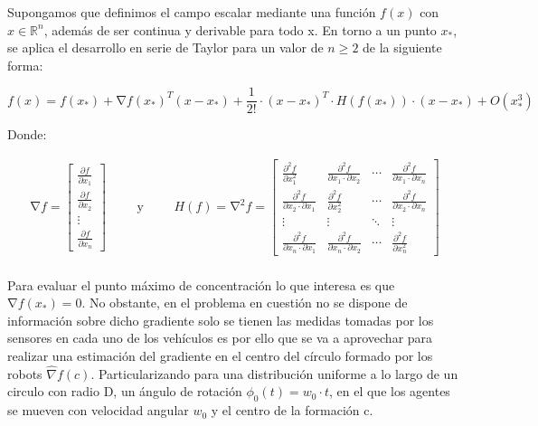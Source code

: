 Supongamos que definimos el campo escalar mediante una función $f\left(x\right)$ con $x\in\mathbb{R}^{n}$, además de ser continua y derivable para todo x. En torno a un punto $x_*$, se aplica el desarrollo en serie de Taylor para un valor de $n\geq{2}$ de la siguiente forma:

\begin{equation}\label{TaylorNormal}
	f\left(x\right)=f\left(x_{*}\right)+\mathrm{\nabla}{f}{\left(x_{*}\right)}^{T}\left(x-x_{*}\right)+\frac{1}{2!}\cdot{\left(x-x_{*}\right)}^{T}\cdot{H}\left({f}\left(x_{*}\right)\right) 		\cdot\left(x-x_{*}\right)+O\left(x_{*}^3\right)
\end{equation}

Donde:

\begin{equation*}
	\begin{aligned}
		\mathrm{\nabla}{f}=
	\begin{bmatrix}
		\frac{\partial{f}}{\partial{x}_1} \\
		\frac{\partial{f}}{\partial{x}_2}  \\
		\vdots \\
		\frac{\partial{f}}{\partial{x}_n}
	\end{bmatrix}
	\end{aligned}
	\qquad\text{y}\qquad
	\begin{aligned}
	{H}\left(f\right)=\mathrm{\nabla}^{2}{f}= 	
	\begin{bmatrix}
		\frac{\partial^{2}{f}}{\partial{x}_{1}^{2}} & \frac{\partial^{2}{f}}{\partial{x}_{1}\cdot\partial{x}_{2}} & \cdots & \frac{\partial^{2}{f}}{\partial{x}_{1}\cdot\partial{x}_{n}}\\
		\frac{\partial^{2}{f}}{\partial{x}_{2}\cdot\partial{x}_{1}} & \frac{\partial^{2}{f}}{\partial{x}_{2}^{2}} & \cdots & \frac{\partial^{2}{f}}{\partial{x}_{2}\cdot\partial{x}_{n}}\\
		\vdots & \vdots & \ddots & \vdots\\
		\frac{\partial^{2}{f}}{\partial{x}_{n}\cdot\partial{x}_{1}} & \frac{\partial^{2}{f}}{\partial{x}_{n}\cdot\partial{x}_{2}} & \cdots & \frac{\partial^{2}{f}}{\partial{x}_{n}^{2}}
	\end{bmatrix}
	\end{aligned}
\end{equation*}\\

Para evaluar el punto máximo de concentración lo que interesa es que $\mathrm{\nabla}{f}{\left(x_{*}\right)}=0$. No obstante, en el problema en cuestión no se dispone de información sobre dicho gradiente solo se tienen las medidas tomadas por los sensores en cada uno de los vehículos es por ello que se va a aprovechar para realizar una estimación del gradiente en el centro del círculo formado por los robots $\hat{\nabla}{f}\left(c\right)$.
\newpage
Particularizando para una distribución uniforme a lo largo de un circulo con radio D, un ángulo de rotación $\phi_0\left(t\right)=w_0\cdot{t}$, en el que los agentes se mueven con velocidad angular $w_0$ y el centro de la formación c. 

